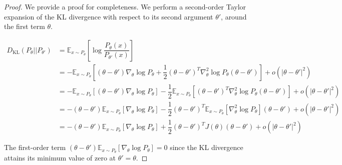 \documentclass[11pt]{article}
\theoremstyle{plain}
\theoremstyle{definition}
\begin{document}
\begin{proof}
We provide a proof for completeness. We perform a second-order Taylor expansion of the KL divergence with respect to its second argument \( \theta' \), around the  first term \( \theta \). 

\begin{align*}
    D_{\text{KL}}(P_{\theta}||P_{\theta'}) &= \mathbb{E}_{x\sim P_{\theta}}\left[\log \dfrac{P_{\theta}(x)}{P_{\theta'}(x)}\right]
    \\ &=-\mathbb{E}_{x\sim P_{\theta}}\left[(\theta-\theta')\nabla_{\theta} \log P_{\theta} + \dfrac{1}{2}(\theta-\theta')^T\nabla^2_{\theta} \log P_{\theta}(\theta-\theta') \right] + o(|\theta-\theta'|^2)
    \\ & = -\mathbb{E}_{x\sim P_{\theta}}\left[(\theta-\theta')\nabla_{\theta} \log P_{\theta}\right] - \dfrac{1}{2}\mathbb{E}_{x\sim P_{\theta}}\left[(\theta-\theta')^T\nabla^2_{\theta} \log P_{\theta}(\theta-\theta') \right] + o(|\theta-\theta'|^2)
    \\ & = -(\theta-\theta')\mathbb{E}_{x\sim P_{\theta}}\left[\nabla_{\theta} \log P_{\theta}\right] - \dfrac{1}{2}(\theta-\theta')^T\mathbb{E}_{x\sim P_{\theta}}\left[\nabla^2_{\theta} \log P_{\theta} \right](\theta-\theta') + o(|\theta-\theta'|^2)
    \\ & = -(\theta-\theta')\mathbb{E}_{x\sim P_{\theta}}\left[\nabla_{\theta} \log P_{\theta}\right] + \dfrac{1}{2}(\theta-\theta')^TJ(\theta)(\theta-\theta') + o(|\theta-\theta'|^2)
\end{align*}

The first-order term $(\theta-\theta')\mathbb{E}_{x\sim P_{\theta}}\left[\nabla_{\theta} \log P_{\theta}\right]=0$ since the KL divergence attains its minimum value of zero at \( \theta' = \theta \).



\end{proof}
\end{document}

